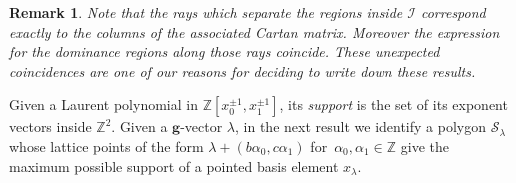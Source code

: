 \documentclass{amsart}
\newtheorem{remark}[theorem]{Remark}
\numberwithin{theorem}{section}
\newcommand{\bfg}{\boldsymbol{g}}
\newcommand{\cI}{\mathcal{I}}
\newcommand{\cS}{\mathcal{S}}
\newcommand{\ZZ}{\mathbb{Z}}
\begin{document}
  \begin{remark}
    Note that the rays which separate the regions inside $\cI$ correspond exactly to the columns of the associated Cartan matrix. %
    Moreover the expression for the dominance regions along those rays coincide.
    These unexpected coincidences are one of our reasons for deciding to write down these results.
  \end{remark}

  Given a Laurent polynomial in $\ZZ[x_0^{\pm1},x_1^{\pm1}]$, its \emph{support} is the set of its exponent vectors inside $\ZZ^2$.
  Given a $\bfg$-vector $\lambda$, in the next result we identify a polygon $\cS_\lambda$ whose lattice points of the form $\lambda+(b \alpha_0 ,c \alpha_1)$ for~$\alpha_0,\alpha_1\in\ZZ$ give the maximum possible support of a pointed basis element $x_\lambda$. 
\end{document}
